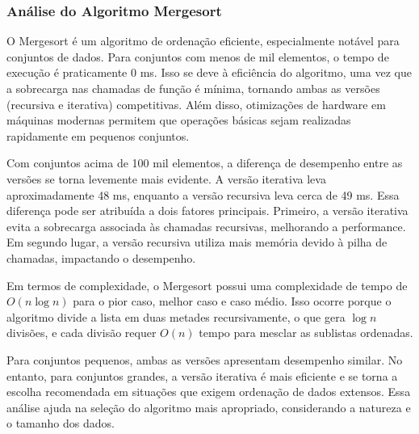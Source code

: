 \subsubsection{Análise do Algoritmo Mergesort}

\hspace{0.6cm}O Mergesort é um algoritmo de ordenação eficiente, especialmente notável para conjuntos de dados. Para conjuntos com menos de mil elementos, o tempo de execução é praticamente 0 ms. Isso se deve à eficiência do algoritmo, uma vez que a sobrecarga nas chamadas de função é mínima, tornando ambas as versões (recursiva e iterativa) competitivas. Além disso, otimizações de hardware em máquinas modernas permitem que operações básicas sejam realizadas rapidamente em pequenos conjuntos.

Com conjuntos acima de 100 mil elementos, a diferença de desempenho entre as versões se torna levemente mais evidente. A versão iterativa leva aproximadamente 48 ms, enquanto a versão recursiva leva cerca de 49 ms. Essa diferença pode ser atribuída a dois fatores principais. Primeiro, a versão iterativa evita a sobrecarga associada às chamadas recursivas, melhorando a performance. Em segundo lugar, a versão recursiva utiliza mais memória devido à pilha de chamadas, impactando o desempenho.

Em termos de complexidade, o Mergesort possui uma complexidade de tempo de \(O(n \log n)\) para o pior caso, melhor caso e caso médio. Isso ocorre porque o algoritmo divide a lista em duas metades recursivamente, o que gera \(\log n\) divisões, e cada divisão requer \(O(n)\) tempo para mesclar as sublistas ordenadas.

Para conjuntos pequenos, ambas as versões apresentam desempenho similar. No entanto, para conjuntos grandes, a versão iterativa é mais eficiente e se torna a escolha recomendada em situações que exigem ordenação de dados extensos. Essa análise ajuda na seleção do algoritmo mais apropriado, considerando a natureza e o tamanho dos dados.
